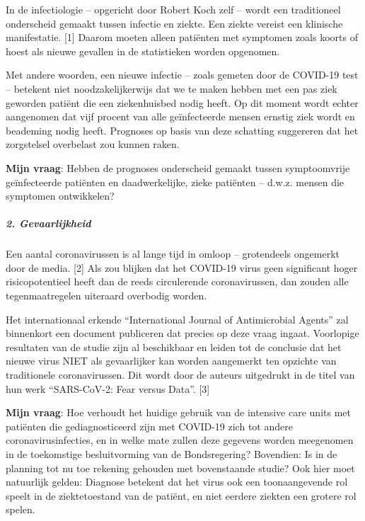 In de infectiologie -- opgericht door Robert Koch zelf -- wordt een
traditioneel onderscheid gemaakt tussen infectie en ziekte. Een ziekte
vereist een klinische manifestatie. {[}1{]} Daarom moeten alleen
patiënten met symptomen zoals koorts of hoest als nieuwe gevallen in de
statistieken worden opgenomen.

Met andere woorden, een nieuwe infectie -- zoals gemeten door de
COVID-19 test -- betekent niet noodzakelijkerwijs dat we te maken hebben
met een pas ziek geworden patiënt die een ziekenhuisbed nodig heeft. Op
dit moment wordt echter aangenomen dat vijf procent van alle
geïnfecteerde mensen ernstig ziek wordt en beademing nodig heeft.
Prognoses op basis van deze schatting suggereren dat het zorgstelsel
overbelast zou kunnen raken.

\textbf{Mijn vraag}: Hebben de prognoses onderscheid gemaakt tussen
symptoomvrije geïnfecteerde patiënten en daadwerkelijke, zieke patiënten
-- d.w.z. mensen die symptomen ontwikkelen?~

\hypertarget{2-gevaarlijkheid}{%
\subparagraph{\texorpdfstring{\textbf{2.
Gevaarlijkheid}}{2. Gevaarlijkheid}}\label{2-gevaarlijkheid}}

Een aantal coronavirussen is al lange tijd in omloop -- grotendeels
ongemerkt door de media. {[}2{]} Als zou blijken dat het COVID-19 virus
geen significant hoger risicopotentieel heeft dan de reeds circulerende
coronavirussen, dan zouden alle tegenmaatregelen uiteraard overbodig
worden.

Het internationaal erkende ``International Journal of Antimicrobial
Agents'' zal binnenkort een document publiceren dat precies op deze
vraag ingaat. Voorlopige resultaten van de studie zijn al beschikbaar en
leiden tot de conclusie dat het nieuwe virus NIET als gevaarlijker kan
worden aangemerkt ten opzichte van traditionele coronavirussen. Dit
wordt door de auteurs uitgedrukt in de titel van hun werk ``SARS-CoV-2:
Fear versus Data''. {[}3{]}

\textbf{Mijn vraag}: Hoe verhoudt het huidige gebruik van de intensive
care units met patiënten die gediagnosticeerd zijn met COVID-19 zich tot
andere coronavirusinfecties, en in welke mate zullen deze gegevens
worden meegenomen in de toekomstige besluitvorming van de Bondsregering?
Bovendien: Is in de planning tot nu toe rekening gehouden met
bovenstaande studie? Ook hier moet natuurlijk gelden: Diagnose betekent
dat het virus ook een toonaangevende rol speelt in de ziektetoestand van
de patiënt, en niet eerdere ziekten een grotere rol spelen.

